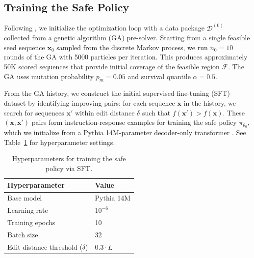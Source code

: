 \subsection{Training the Safe Policy}
\label{subsec:safe_policy_training}

Following \citet{chen2025generalists}, we initialize the optimization loop with a data package $\mathcal{D}^{(0)}$ collected from a genetic algorithm (GA) pre-solver. Starting from a single feasible seed sequence $\mathbf{x}_0$ sampled from the discrete Markov process, we run $n_0=10$ rounds of the GA with 5000 particles per iteration. This produces approximately 50K scored sequences that provide initial coverage of the feasible region $\mathcal{F}$. The GA uses mutation probability $p_m=0.05$ and survival quantile $\alpha=0.5$.

From the GA history, we construct the initial supervised fine-tuning (SFT) dataset by identifying improving pairs: for each sequence $\mathbf{x}$ in the history, we search for sequences $\mathbf{x}'$ within edit distance $\delta$ such that $f(\mathbf{x}') > f(\mathbf{x})$. These $(\mathbf{x}, \mathbf{x}')$ pairs form instruction-response examples for training the safe policy $\pi_{\theta_0}$, which we initialize from a Pythia 14M-parameter decoder-only transformer \citep{biderman2023pythia}. See Table~\ref{tab:sft_hyperparams} for hyperparameter settings.

\begin{table}[h]
\centering
\caption{Hyperparameters for training the safe policy via SFT.}
\label{tab:sft_hyperparams}
\begin{tabular}{ll}
\toprule
\textbf{Hyperparameter} & \textbf{Value} \\
\midrule
Base model & Pythia 14M \\
Learning rate & $10^{-6}$ \\
Training epochs & 10 \\
Batch size & 32 \\
Edit distance threshold ($\delta$) & $0.3 \cdot L$ \\
\bottomrule
\end{tabular}
\end{table}

